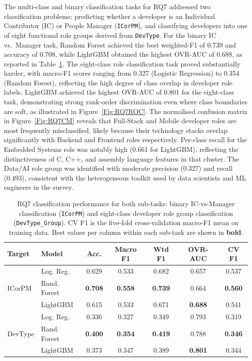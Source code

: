\documentclass[journal, onecolumn]{IEEEtran}
\begin{document}
The multi-class and binary classification tasks for RQ7 addressed two classification problems: predicting whether a developer is an Individual Contributor (IC) or People Manager (\texttt{ICorPM}), and classifying developers into one of eight functional role groups derived from \texttt{DevType}.
For the binary IC vs.\ Manager task, Random Forest achieved the best weighted-F1 of 0.739 and accuracy of 0.708, while LightGBM obtained the highest OVR-AUC of 0.688, as reported in Table~\ref{tab:RQ7Models}.
The eight-class role classification task proved substantially harder, with macro-F1 scores ranging from 0.327 (Logistic Regression) to 0.354 (Random Forest), reflecting the high degree of class overlap in developer role labels.
LightGBM achieved the highest OVR-AUC of 0.801 for the eight-class task, demonstrating strong rank-order discrimination even where class boundaries are soft, as illustrated in Figure~\ref{Fig:RQ7ROC}.
The normalised confusion matrix in Figure~\ref{Fig:RQ7CM} reveals that Full-Stack and Mobile developer roles are most frequently misclassified, likely because their technology stacks overlap significantly with Backend and Frontend roles respectively.
Per-class recall for the Embedded Systems role was notably high (0.661 for LightGBM), reflecting the distinctiveness of C, C++, and assembly language features in that cluster.
The Data/AI role group was identified with moderate precision (0.327) and recall (0.493), consistent with the heterogeneous toolkit used by data scientists and ML engineers in the survey.

\begin{table}[!ht]
\centering
\caption{RQ7 classification performance for both sub-tasks: binary IC-vs-Manager classification (\texttt{ICorPM}) and eight-class developer role group classification (\texttt{DevType\_Group}). CV F1 is the five-fold cross-validation macro-F1 mean on training data. Best values per column within each sub-task are shown in \textbf{bold}.}
\label{tab:RQ7Models}
\begin{tabular}{|l|l|c|c|c|c|c|}
\hline
\textbf{Target} & \textbf{Model} & \textbf{Acc.} & \textbf{Macro F1} & \textbf{Wtd F1} & \textbf{OVR-AUC} & \textbf{CV F1} \\ \hline
\multirow{3}{*}{ICorPM} & Log. Reg. & 0.629 & 0.533 & 0.682 & 0.657 & 0.537 \\ \cline{2-7}
 & Rand. Forest & \textbf{0.708} & \textbf{0.558} & \textbf{0.739} & 0.664 & \textbf{0.560} \\ \cline{2-7}
 & LightGBM & 0.615 & 0.533 & 0.671 & \textbf{0.688} & 0.541 \\ \hline
\multirow{3}{*}{DevType} & Log. Reg. & 0.336 & 0.327 & 0.349 & 0.793 & 0.319 \\ \cline{2-7}
 & Rand. Forest & \textbf{0.400} & \textbf{0.354} & \textbf{0.419} & 0.788 & \textbf{0.346} \\ \cline{2-7}
 & LightGBM & 0.373 & 0.347 & 0.389 & \textbf{0.801} & 0.344 \\ \hline
\end{tabular}
\end{table}
\end{document}
